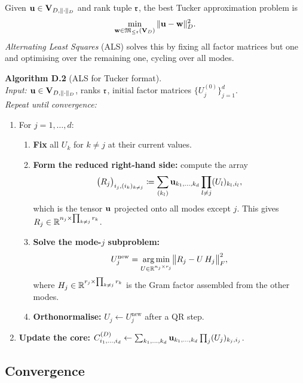 Given $\mathbf{u} \in \mathbf{V}_{D,\|\cdot\|_D}$ and rank tuple $\mathfrak{r}$, the best Tucker
approximation problem is
\begin{equation}
\label{eq:app:als_problem}
    \min_{\mathbf{w} \in \mathfrak{M}_{\leq\mathfrak{r}}(\mathbf{V}_D)} \|\mathbf{u} - \mathbf{w}\|_D^2.
\end{equation}
\emph{Alternating Least Squares} (ALS) solves this by fixing all
factor matrices but one and optimising over the remaining one,
cycling over all modes.

\medskip
\noindent\textbf{Algorithm D.2} (ALS for Tucker format).\\
\textit{Input:} $\mathbf{u} \in \mathbf{V}_{D,\|\cdot\|_D}$, ranks $\mathfrak{r}$, initial factor
matrices $\{U_j^{(0)}\}_{j=1}^d$.\\
\textit{Repeat until convergence:}
\begin{enumerate}
\item For $j = 1,\ldots,d$:
    \begin{enumerate}
    \item \textbf{Fix} all $U_k$ for $k \neq j$ at their current values.
    \item \textbf{Form the reduced right-hand side:} compute the array
        \begin{equation*}
            \bigl(R_j\bigr)_{i_j, (i_k)_{k \neq j}}
            \coloneqq
            \sum_{(k_l)} \mathbf{u}_{k_1,\ldots,k_d}
            \prod_{l \neq j} (U_l)_{k_l, i_l},
        \end{equation*}
        which is the tensor $\mathbf{u}$ projected onto all modes except $j$.
        This gives $R_j \in \mathbb{R}^{n_j \times \prod_{k \neq j} r_k}$.
    \item \textbf{Solve the mode-$j$ subproblem:}
        \begin{equation*}
            U_j^{\mathrm{new}}
            = \operatorname*{arg\,min}_{U \in \mathbb{R}^{n_j \times r_j}}
              \bigl\|R_j - U\, H_j\bigr\|_F^2,
        \end{equation*}
        where $H_j \in \mathbb{R}^{r_j \times \prod_{k \neq j} r_k}$ is the
        Gram factor assembled from the other modes.
    \item \textbf{Orthonormalise:} $U_j \leftarrow U_j^{\mathrm{new}}$
        after a QR step.
    \end{enumerate}
\item \textbf{Update the core:}
    $C^{(D)}_{i_1,\ldots,i_d} \leftarrow
    \sum_{k_1,\ldots,k_d} \mathbf{u}_{k_1,\ldots,k_d}
    \prod_j (U_j)_{k_j,i_j}$.
\end{enumerate}

\subsection*{Convergence}

